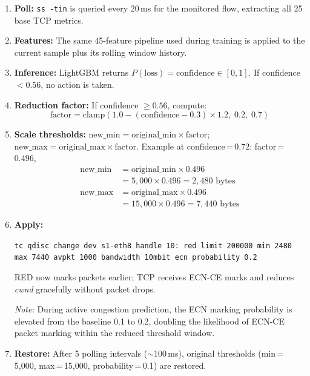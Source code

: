 \documentclass[journal]{IEEEtran}
\begin{document}
\begin{enumerate}
  \item \textbf{Poll:} \texttt{ss -tin} is queried every 20\,ms for the monitored flow, extracting all 25 base TCP metrics.
  \item \textbf{Features:} The same 45-feature pipeline used during training is applied to the current sample plus its rolling window history.
  \item \textbf{Inference:} LightGBM returns $P(\text{loss}) = \text{confidence} \in [0,1]$. If confidence $< 0.56$, no action is taken.
  \item \textbf{Reduction factor:} If confidence $\geq 0.56$, compute:
    \begin{equation}
      \text{factor} = \text{clamp}(1.0 - (\text{confidence} - 0.3) \times 1.2,\; 0.2,\; 0.7)
    \end{equation}
  \item \textbf{Scale thresholds:} $\text{new\_min} = \text{original\_min} \times \text{factor}$; $\text{new\_max} = \text{original\_max} \times \text{factor}$.
    Example at confidence\,=\,0.72: factor\,=\,0.496,
    \begin{align*}
      \text{new\_min} &= \text{original\_min} \times 0.496 \\&= 5{,}000 \times 0.496 = 2{,}480\text{ bytes}\\
      \text{new\_max} &= \text{original\_max} \times 0.496 \\&= 15{,}000 \times 0.496 = 7{,}440\text{ bytes}
    \end{align*}
  \item \textbf{Apply:}
\begin{sloppypar}
\texttt{tc qdisc change dev s1-eth8 handle 10: red limit 200000 min 2480 max 7440 avpkt 1000 bandwidth 10mbit ecn probability 0.2}
\end{sloppypar}
    RED now marks packets earlier; TCP receives ECN-CE marks and reduces \emph{cwnd} gracefully without packet drops.

    \textit{Note:} During active congestion prediction, the ECN marking probability is elevated from the baseline 0.1 to 0.2, doubling the likelihood of ECN-CE packet marking within the reduced threshold window.

  \item \textbf{Restore:} After 5 polling intervals ($\sim$100\,ms), original thresholds (min\,=\,5,000, max\,=\,15,000, probability\,=\,0.1) are restored.
\end{enumerate}
\end{document}

